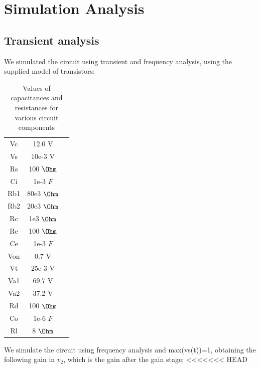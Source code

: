 \section{Simulation Analysis}
\label{sec:simulation}

\subsection{Transient analysis}

We simulated the circuit using transient and frequency analysis, using the supplied model of transistors:

\begin{table}[H]
\addtolength{\tabcolsep}{-4pt}
\caption{Values of capacitances and resistances for various circuit components}
\vspace{-3mm}
\begin{tabular}{|c|c|c|}
\hline
Vc & 12.0 V\\
Vs & 10e-3 V\\
Rs & 100 $\Ohm$\\
Ci & 1e-3 $F$\\
Rb1& 80e3 $\Ohm$\\
Rb2&20e3 $\Ohm$\\
Rc & 1e3 $\Ohm$\\
Re &100 $\Ohm$\\
Ce & 1e-3 $F$\\
Von&0.7 V\\
Vt&25e-3 V\\
Va1&69.7 V\\
Va2&37.2 V\\
Rd & 100 $\Ohm$\\
Co & 1e-6 $F$\\
Rl & 8 $\Ohm$\\

\hline
\end{tabular}
\label{tab:Components}
\end{table}

\par

We simulate the circuit using frequency analysis and max(vs(t))=1, obtaining the following gain in $v_2$, which is the gain after the gain stage:
<<<<<<< HEAD

